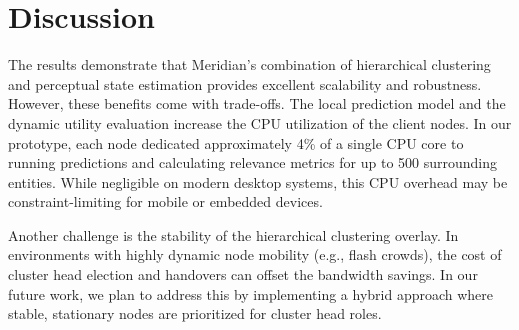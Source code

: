 \section{Discussion}
The results demonstrate that Meridian's combination of hierarchical clustering and perceptual state estimation provides excellent scalability and robustness. However, these benefits come with trade-offs. The local prediction model and the dynamic utility evaluation increase the CPU utilization of the client nodes. In our prototype, each node dedicated approximately 4\% of a single CPU core to running predictions and calculating relevance metrics for up to 500 surrounding entities. While negligible on modern desktop systems, this CPU overhead may be constraint-limiting for mobile or embedded devices.

Another challenge is the stability of the hierarchical clustering overlay. In environments with highly dynamic node mobility (e.g., flash crowds), the cost of cluster head election and handovers can offset the bandwidth savings. In our future work, we plan to address this by implementing a hybrid approach where stable, stationary nodes are prioritized for cluster head roles.
